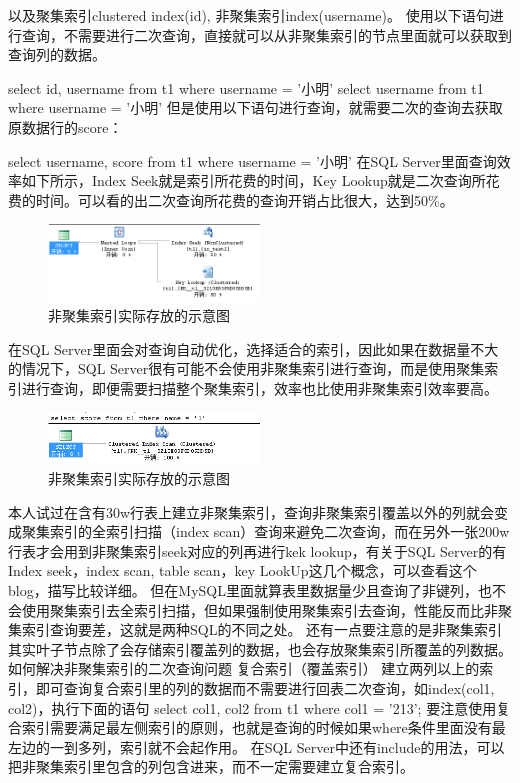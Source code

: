 \documentclass[UTF8]{ctexart}
\begin{document}
以及聚集索引clustered index(id), 非聚集索引index(username)。
使用以下语句进行查询，不需要进行二次查询，直接就可以从非聚集索引的节点里面就可以获取到查询列的数据。

select id, username from t1 where username = '小明'
select username from t1 where username = '小明'
但是使用以下语句进行查询，就需要二次的查询去获取原数据行的score：

select username, score from t1 where username = '小明'
在SQL Server里面查询效率如下所示，Index Seek就是索引所花费的时间，Key Lookup就是二次查询所花费的时间。可以看的出二次查询所花费的查询开销占比很大，达到50\%。
\begin{figure}[htbp]
\centering
\includegraphics[height=0.2\linewidth,width=0.5\textwidth]{Figure/index2.png}
\caption{非聚集索引实际存放的示意图}
\end{figure}

在SQL Server里面会对查询自动优化，选择适合的索引，因此如果在数据量不大的情况下，SQL Server很有可能不会使用非聚集索引进行查询，而是使用聚集索引进行查询，即便需要扫描整个聚集索引，效率也比使用非聚集索引效率要高。
\begin{figure}[htbp]
\centering
\includegraphics[height=0.2\linewidth,width=0.5\textwidth]{Figure/index3.png}
\caption{非聚集索引实际存放的示意图}
\end{figure}
本人试过在含有30w行表上建立非聚集索引，查询非聚集索引覆盖以外的列就会变成聚集索引的全索引扫描（index scan）查询来避免二次查询，而在另外一张200w行表才会用到非聚集索引seek对应的列再进行kek lookup，有关于SQL Server的有Index seek，index scan, table scan，key LookUp这几个概念，可以查看这个blog，描写比较详细。
但在MySQL里面就算表里数据量少且查询了非键列，也不会使用聚集索引去全索引扫描，但如果强制使用聚集索引去查询，性能反而比非聚集索引查询要差，这就是两种SQL的不同之处。
还有一点要注意的是非聚集索引其实叶子节点除了会存储索引覆盖列的数据，也会存放聚集索引所覆盖的列数据。
如何解决非聚集索引的二次查询问题
复合索引（覆盖索引）
建立两列以上的索引，即可查询复合索引里的列的数据而不需要进行回表二次查询，如index(col1, col2)，执行下面的语句
select col1, col2 from t1 where col1 = '213';
要注意使用复合索引需要满足最左侧索引的原则，也就是查询的时候如果where条件里面没有最左边的一到多列，索引就不会起作用。
在SQL Server中还有include的用法，可以把非聚集索引里包含的列包含进来，而不一定需要建立复合索引。
\end{document}
